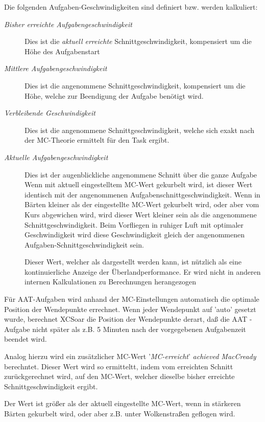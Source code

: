 Die folgenden Aufgaben-Geschwindigkeiten sind definiert bzw. werden kalkuliert:
\begin{description}
\item[\textit{Bisher erreichte Aufgabengeschwindigkeit}]  Dies ist die \emph{aktuell
erreichte} Schnittgeschwindigkeit, kompensiert um die Höhe des Aufgabenstart 
\item[\textit{Mittlere Aufgabengeschwindigkeit}] Dies ist die angenommene
Schnittgeschwindigkeit, kompensiert um die Höhe, welche zur Beendigung der Aufgabe benötigt wird.
\item[\textit{Verbleibende Geschwindigkeit}]  Dies ist die angenommene Schnittgeschwindigkeit,
welche sich exakt nach der MC-Theorie ermittelt für den Task ergibt.
\item[\textit{Aktuelle Aufgabengeschwindigkeit}]  Dies ist der augenblickliche
angenommene Schnitt über die ganze Aufgabe
Wenn mit aktuell eingestelltem MC-Wert gekurbelt wird, ist dieser Wert
identisch mit der angenommenen Aufgabenschnittgeschwindigkeit.
Wenn in Bärten kleiner als der eingestellte MC-Wert gekurbelt wird, oder aber vom Kurs
abgewichen wird,  wird dieser Wert kleiner sein als die angenommene Schnittgeschwindigkeit.
Beim Vorfliegen in ruhiger Luft mit optimaler Geschwindigkeit wird diese Geschwindigkeit
gleich der angenommenen Aufgaben-Schnittgeschwindigkeit sein.

Dieser Wert, welcher als {\InfoBox} dargestellt werden kann, ist nützlich als eine kontinuierliche Anzeige
der Überlandperformance. Er wird nicht in anderen internen Kalkulationen zu Berechnungen herangezogen
\end{description}

Für AAT-Aufgaben wird anhand der MC-Einstellungen automatisch die optimale Position
der Wendepunkte errechnet.  \tip Wenn jeder Wendepunkt auf  'auto'  gesetzt wurde,  berechnet
\textsf{XCSoar} die Position der Wendepunkte derart, daß die AAT - Aufgabe nicht später als z.B. 5
Minuten nach der vorgegebenen Aufgabenzeit beendet wird.

Analog hierzu wird ein zusätzlicher MC-Wert '\emph{MC-erreicht}' {\em achieved MacCready} berechntet.
Dieser Wert wird so ermitteltt, indem vom erreichten Schnitt zurückgerechnet wird,
auf den MC-Wert, welcher dieselbe bisher erreichte Schnittgeschwindigkeit ergibt.

Der Wert ist größer als der aktuell eingestellte MC-Wert, wenn in stärkeren Bärten gekurbelt
wird, oder aber z.B. unter Wolkenstraßen geflogen wird.

